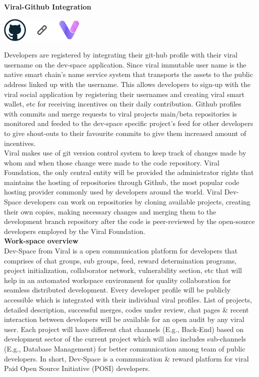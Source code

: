 \documentclass[10pt]{article}
\begin{document}
\textbf{Viral-Github Integration}\\

\begin{center}
\includegraphics[width=4cm]{git-int}
\end{center}

Developers are registered by integrating their git-hub profile with their viral username on the dev-space application. Since viral immutable user name is the native smart chain's name service system that transports the assets to the public address linked up with the username. This allows developers to sign-up with the viral social application by registering their usernames and creating viral smart wallet, etc for receiving incentives on their daily contribution. Github profiles with commits and merge requests to viral projects main/beta repositories is monitored and feeded to the dev-space specific project's feed for other developers to give shout-outs to their favourite commits to give them increased amount of incentives.\\

Viral makes use of git version control system to keep track of changes made by whom and when those change were made to the code repository. Viral Foundation, the only central entity will be provided the administrator rights that maintains the hosting of repositories through Github, the most popular code hosting provider commonly used by developers around the world. Viral Dev-Space developers can work on repositories by cloning available projects, creating their own copies, making necessary changes and merging them to the development branch repository after the code is peer-reviewed by the open-source developers employed by the Viral Foundation.\\ 

\textbf{Work-space overview}\\

Dev-Space from Viral is a open communication platform for developers that comprises of chat groups, sub groups, feed, reward determination programs, project initialization, collaborator network, vulnerability section, etc that will help in an automated workspace environment for quality collaboration for seamless distributed development. Every developer profile will be publicly accessible which is integrated with their individual viral profiles. List of projects, detailed description, successful merges, codes under review, chat pages \& recent interaction between developers will be available for an open audit by any viral user. Each project will have different chat channels (E.g., Back-End) based on development sector of the current project which will also includes sub-channels (E.g., Database Management) for better communication among team of public developers. In short, Dev-Space is a communication \& reward platform for viral Paid Open Source Initiative (POSI) developers.\\
\end{document}

